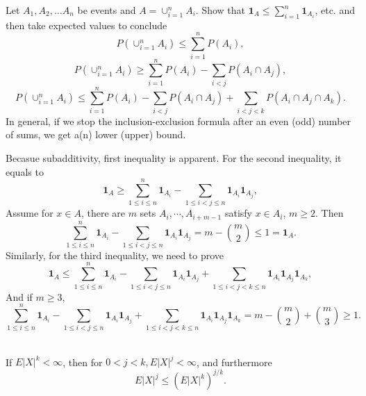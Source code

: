 \documentclass[en, normal, 11pt, black]{elegantnote}
\newenvironment{exercise}[1]{\begin{tcolorbox}[colback=black!15, colframe=black!80, breakable, title=#1]}{\end{tcolorbox}}
\renewenvironment{proof}{\begin{tcolorbox}[colback=white, colframe=black!50, breakable, title=Proof. ]\setlength{\parskip}{0.8em}}{\,\\\rightline{$\square$}\end{tcolorbox}}
\begin{document}
    \begin{exercise}{1.6.10. Bonferroni inequalities.}
        Let $A_{1}, A_{2}, \ldots A_{n}$ be events and $A=\cup_{i=1}^{n} A_{i} .$ Show that $\mathbf{1}_{A} \leq \sum_{i=1}^{n} \mathbf{1}_{A_{i}}$, etc. and then take expected values to conclude
        \[
            P\left(\cup_{i=1}^{n} A_{i}\right) \leq \sum_{i=1}^{n} P\left(A_{i}\right), 
        \]
        \[
            P\left(\cup_{i=1}^{n} A_{i}\right) \geq \sum_{i=1}^{n} P\left(A_{i}\right)-\sum_{i<j} P\left(A_{i} \cap A_{j}\right), 
        \]
        \[
            P\left(\cup_{i=1}^{n} A_{i}\right) \leq \sum_{i=1}^{n} P\left(A_{i}\right)-\sum_{i<j} P\left(A_{i} \cap A_{j}\right)+\sum_{i<j<k} P\left(A_{i} \cap A_{j} \cap A_{k}\right). 
        \]
        In general, if we stop the inclusion-exclusion formula after an even (odd) number of sums, we get a(n) lower (upper) bound. 
    \end{exercise}
    \begin{proof}
        Becasue subadditivity, first inequality is apparent. For the second inequality, it equals to 
        \[
            \mathbf{1}_{A} \geqslant \sum_{1\leqslant i\leqslant n}^{n} \mathbf{1}_{A_{i}}-\sum_{1\leqslant i<j\leqslant n} \mathbf{1}_{A_{i}} \mathbf{1}_{A_{j}}, 
        \]
        Assume for $x\in A$, there are $m$ sets $A_i, \cdots, A_{i+m-1}$ satisfy $x\in A_i$, $m\geqslant2$. Then
        \[
            \sum_{1\leqslant i\leqslant n}^{n} \mathbf{1}_{A_{i}}-\sum_{1\leqslant i<j\leqslant n} \mathbf{1}_{A_{i}} \mathbf{1}_{A_{j}}
            =m-\binom{m}{2} \leqslant 1=\mathbf{1}_{A}. 
        \]
        Similarly, for the third inequality, we need to prove
        \[
            \mathbf{1}_{A} \leqslant \sum_{1\leqslant i\leqslant n}^{n} \mathbf{1}_{A_{i}}-\sum_{1\leqslant i<j\leqslant n} \mathbf{1}_{A_{i}} \mathbf{1}_{A_{j}}+\sum_{1\leqslant i<j<k\leqslant n} \mathbf{1}_{A_{i}} \mathbf{1}_{A_{j}}\mathbf{1}_{A_{k}}, 
        \]
        And if $m\geqslant3$, 
        \[
            \sum_{1\leqslant i\leqslant n}^{n} \mathbf{1}_{A_{i}}-\sum_{1\leqslant i<j\leqslant n} \mathbf{1}_{A_{i}} \mathbf{1}_{A_{j}}+\sum_{1\leqslant i<j<k\leqslant n} \mathbf{1}_{A_{i}} \mathbf{1}_{A_{j}}\mathbf{1}_{A_{k}}=m-\binom{m}{2}+\binom{m}{3}\geqslant1. 
        \]
        \vspace{-30pt}
    \end{proof}


    \begin{exercise}{1.6.11.}
        If $E|X|^{k}<\infty$, then for $0<j<k, E|X|^{j}<\infty$, and furthermore 
        \[
            E|X|^{j} \leq\left(E|X|^{k}\right)^{j / k}. 
        \]
    \end{exercise}
\end{document}
